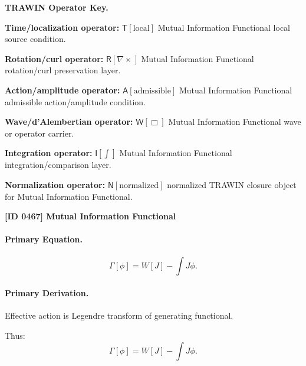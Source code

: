 \par\vspace{0.45\baselineskip}
\noindent\begin{minipage}[t]{\linewidth}
\begingroup
\small
\raggedright
\textbf{TRAWIN Operator Key.}\par
\noindent\textbf{Time/localization operator:} $\mathsf{T}\!\left[\mathrm{local}\right]$ Mutual Information Functional local source condition.\par
\noindent\textbf{Rotation/curl operator:} $\mathsf{R}\!\left[\nabla\times\right]$ Mutual Information Functional rotation/curl preservation layer.\par
\noindent\textbf{Action/amplitude operator:} $\mathsf{A}\!\left[\mathrm{admissible}\right]$ Mutual Information Functional admissible action/amplitude condition.\par
\noindent\textbf{Wave/d'Alembertian operator:} $\mathsf{W}\!\left[\Box\right]$ Mutual Information Functional wave or operator carrier.\par
\noindent\textbf{Integration operator:} $\mathsf{I}\!\left[\int\right]$ Mutual Information Functional integration/comparison layer.\par
\noindent\textbf{Normalization operator:} $\mathsf{N}\!\left[\mathrm{normalized}\right]$ normalized TRAWIN closure object for Mutual Information Functional.\par
\endgroup
\end{minipage}

\clearpage
\noindent\textbf{[ID 0467] Mutual Information Functional}\par
\vspace{0.35em}
\paragraph{Primary Equation.}
\begin{equation}
\Gamma[\phi] = W[J] - \int J\phi.
\end{equation}

\paragraph{Primary Derivation.}
Effective action is Legendre transform of generating functional.

Thus:
\begin{equation}
\boxed{
\Gamma[\phi] = W[J] - \int J\phi.
}
\end{equation}

